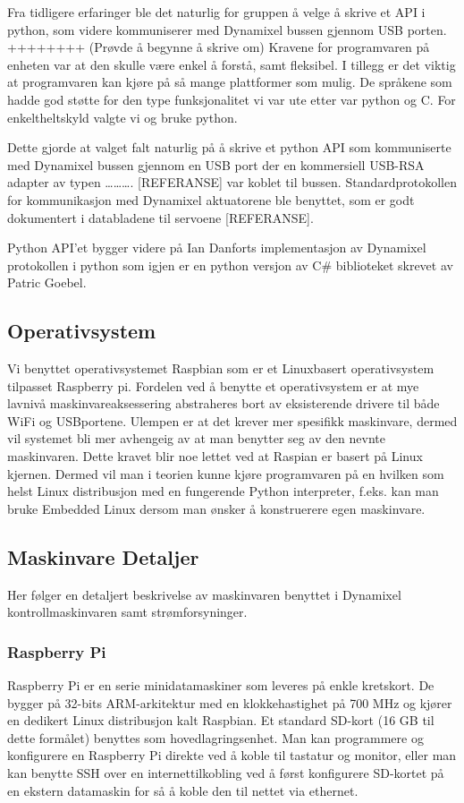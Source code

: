 \documentclass[12pt]{report}
\begin{document}
Fra tidligere erfaringer ble det naturlig for gruppen å velge å skrive et API i python, som videre kommuniserer med Dynamixel bussen gjennom USB porten. ++++++++
(Prøvde å begynne å skrive om) 
Kravene for programvaren på enheten var at den skulle være enkel å forstå, samt fleksibel. I tillegg er det viktig at programvaren kan kjøre på så mange plattformer som mulig. De språkene som hadde god støtte for den type funksjonalitet vi var ute etter var python og C. For enkeltheltskyld valgte vi og bruke python.

Dette gjorde at valget falt naturlig på å skrive et python API som kommuniserte med Dynamixel bussen gjennom en USB port der en kommersiell USB-RSA adapter av typen ………. [REFERANSE] var koblet til bussen. Standardprotokollen for kommunikasjon med Dynamixel aktuatorene ble benyttet, som er godt dokumentert i databladene til servoene [REFERANSE]. 

Python API’et bygger videre på Ian Danforts implementasjon av Dynamixel protokollen i python som igjen er en python versjon av C\# biblioteket skrevet av Patric Goebel.

\subsection{Operativsystem}
Vi benyttet operativsystemet Raspbian som er et Linuxbasert operativsystem tilpasset Raspberry pi. Fordelen ved å benytte et operativsystem er at mye lavnivå maskinvareaksessering abstraheres bort av eksisterende drivere til både WiFi og USBportene. Ulempen er at det krever mer spesifikk maskinvare, dermed vil systemet bli mer avhengeig av at man benytter seg av den nevnte maskinvaren. Dette kravet blir noe lettet ved at Raspian er basert på Linux kjernen. Dermed vil man i teorien kunne kjøre programvaren på en hvilken som helst Linux distribusjon med en fungerende Python interpreter, f.eks. kan man bruke Embedded Linux dersom man ønsker å konstruerere egen maskinvare.

\subsection{Maskinvare Detaljer}
Her følger en detaljert beskrivelse av maskinvaren benyttet i Dynamixel kontrollmaskinvaren samt strømforsyninger.

\subsubsection{Raspberry Pi}Raspberry Pi er en serie minidatamaskiner som leveres på enkle kretskort. De bygger på 32-bits ARM-arkitektur med en klokkehastighet på 700 MHz og kjører en dedikert Linux distribusjon kalt Raspbian. Et standard SD-kort (16 GB til dette formålet) benyttes som hovedlagringsenhet. Man kan programmere og konfigurere en Raspberry Pi direkte ved å koble til tastatur og monitor, eller man kan benytte SSH over en internettilkobling ved å først konfigurere SD-kortet på en ekstern datamaskin for så å koble den til nettet via ethernet.
\end{document}
